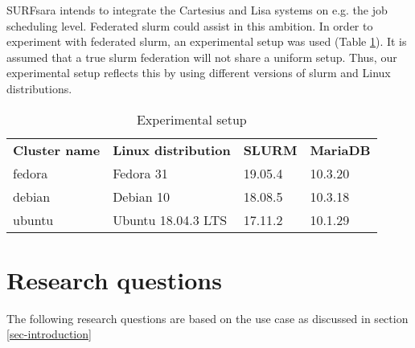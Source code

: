 \documentclass[conference]{IEEEtran}
\begin{document}
SURFsara intends to integrate the Cartesius and Lisa systems on e.g. the job scheduling level. Federated \gls{slurm} could assist in this ambition. In order to experiment with federated \gls{slurm}, an experimental setup was used (Table \ref{tab-experimental-setup}). It is assumed that a true \gls{slurm} federation will not share a uniform setup. Thus, our experimental setup reflects this by using different versions of \gls{slurm} and Linux distributions.

\begin{table}[H]
\caption{Experimental setup}
\label{tab-experimental-setup}
\begin{tabular}{llll}
\textbf{Cluster name} & \textbf{Linux distribution} & \textbf{SLURM} & \textbf{MariaDB} \\
fedora                & Fedora 31                   & 19.05.4        & 10.3.20          \\
debian                & Debian 10                   & 18.08.5        & 10.3.18          \\
ubuntu                & Ubuntu 18.04.3 LTS          & 17.11.2        & 10.1.29         
\end{tabular}
\end{table}

\section{Research questions}
The following research questions are based on the use case as discussed in section \ref{sec-introduction}




\end{document}
